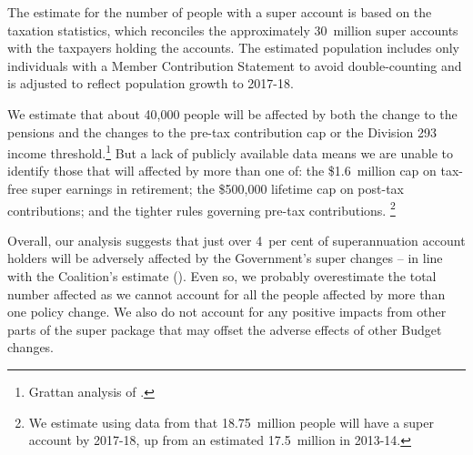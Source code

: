 \documentclass[continuous]{grattan}\usepackage[]{graphicx}\usepackage[]{color}
\begin{document}
\vfill\eject 

The estimate for the number of people with a super account is based on the \ATO{} taxation statistics, which reconciles the approximately 30~million super accounts with the taxpayers holding the accounts. 
The estimated population includes only individuals with a Member Contribution Statement to avoid double-counting and is adjusted to reflect population growth to 2017-18.

We estimate that about 40,000 people will be affected by both the change to the \TTR{} pensions and the changes to the pre-tax contribution cap or the Division 293 income threshold.\footnote{Grattan analysis of \textcite{ABS2015-Survey-of-income-and-housing-2013-14}.} %
But a lack of publicly available data means we are unable to identify those that will affected by more than one of: the \$1.6~million cap on tax-free super earnings in retirement; the \$500,000 lifetime cap on post-tax contributions; and the tighter rules governing pre-tax contributions.%
\footnote{We estimate using data from \textcites{APRA2016-Annual-Superannuation-Bulletin-Jun2015}{ATOTaxstats201314} that 18.75~million people will have a super account by 2017-18, up from an estimated 17.5~million in 2013-14.} %

Overall, our analysis suggests that just over 4~per cent of superannuation account holders will be adversely affected by the Government's super changes -- in line with the Coalition's estimate (). 
Even so, we probably overestimate the total number affected as we cannot account for all the people affected by more than one policy change. 
We also do not account for any positive impacts from other parts of the super package that may offset the adverse effects of other Budget changes.
\end{document}
